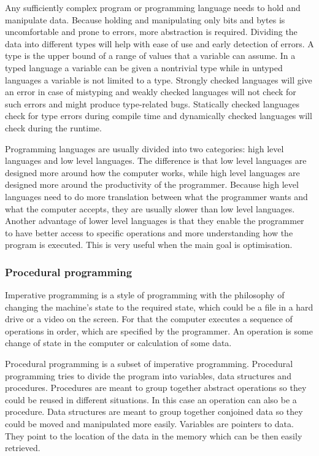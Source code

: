 
Any sufficiently complex program or programming language needs to hold and
manipulate data. Because holding and manipulating only bits and bytes is
uncomfortable and prone to errors, more abstraction is required. Dividing the
data into different types will help with ease of use and early detection of
errors. A type is the upper bound of a range of values that a variable can
assume. In a typed language a variable can be given a nontrivial type while in
untyped languages a variable is not limited to a type. Strongly checked
languages will give an error in case of mistyping and weakly checked languages
will not check for such errors and might produce type-related bugs. Statically
checked languages check for type errors during compile time and dynamically
checked languages will check during the runtime.\cite{cardelli96}

Programming languages are usually divided into two categories: high level
languages and low level languages. The difference is that low level languages
are designed more around how the computer works, while high level languages are
designed more around the productivity of the programmer. Because high level
languages need to do more translation between what the programmer wants and what
the computer accepts, they are usually slower than low level languages. Another
advantage of lower level languages is that they enable the programmer to have
better access to specific operations and more understanding how the program is
executed. This is very useful when the main goal is
optimisation.\cite{website:scripting-languages}

\subsubsection{Procedural programming}

Imperative programming is a style of programming with the philosophy of changing the machine's state to the required state, which could be a file in a hard drive or a video on the screen. For that the computer executes a sequence of operations in order, which are specified by the programmer. An operation is some change of state in the computer or calculation of some data.

Procedural programming is a subset of imperative programming. Procedural programming tries to divide the program into variables, data structures and procedures. Procedures are meant to group together abstract operations so they could be reused in different situations. In this case an operation can also be a procedure. Data structures are meant to group together conjoined data so they could be moved and manipulated more easily. Variables are pointers to data. They point to the location of the data in the memory which can be then easily retrieved.

